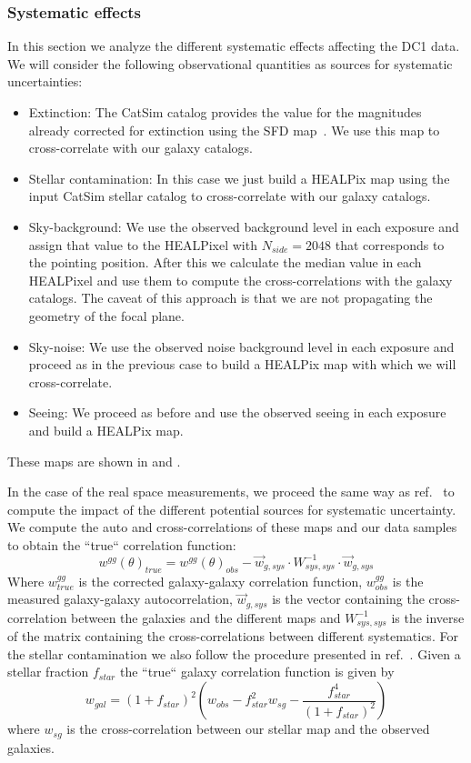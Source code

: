 \documentclass[\docopts]{\docclass}
\begin{document}
\subsubsection{Systematic effects}
\label{ssec:systematics}
In this section we analyze the different systematic effects affecting the DC1 data. We will consider the following observational quantities as sources for systematic uncertainties:
\begin{itemize}
\item Extinction: The CatSim catalog provides the value for the magnitudes already corrected for extinction using the SFD map~\citep{1998ApJ...500..525S}. We use this map to cross-correlate with our galaxy catalogs.
\item Stellar contamination: In this case we just build a HEALPix map using the input CatSim stellar catalog to cross-correlate with our galaxy catalogs.
\item Sky-background: We use the observed background level in each exposure and assign that value to the HEALPixel with $N_{side}=2048$ that corresponds to the pointing position. After this we calculate the median value in each HEALPixel and use them to compute the cross-correlations with the galaxy catalogs. The caveat of this approach is that we are not propagating the geometry of the focal plane.
\item Sky-noise: We use the observed noise background level in each exposure and proceed as in the previous case to build a HEALPix map with which we will cross-correlate.
\item Seeing: We proceed as before and use the observed seeing in each exposure and build a HEALPix map.
\end{itemize}
These maps are shown in  and . 

In the case of the real space measurements, we proceed the same way as ref.~\citep{2016MNRAS.455.4301C} to compute the impact of the different potential sources for systematic uncertainty. We compute the auto and cross-correlations of these maps and our data samples to obtain the ``true`` correlation function:
\begin{equation}
w^{gg}(\theta)_{true} =w^{gg}(\theta)_{obs} -  \vec{w}_{g,sys} \cdot W_{sys,sys}^{-1} \cdot \vec{w}_{g,sys}
\end{equation}
Where $w^{gg}_{true}$ is the corrected galaxy-galaxy correlation function, $w^{gg}_{obs}$ is the measured galaxy-galaxy autocorrelation, $\vec{w}_{g,sys}$ is the vector containing the cross-correlation between the galaxies and the different maps and $W_{sys,sys}^{-1}$ is the inverse of the matrix containing the cross-correlations between different systematics. For the stellar contamination we also follow the procedure presented in ref.~\citep{2016MNRAS.455.4301C}. Given a stellar fraction $f_{star}$ the ``true`` galaxy correlation function is given by
\begin{equation}
w_{gal} = \left(1+f_{star}\right)^{2}\left(w_{obs} - f_{star}^{2}w_{sg} - \frac{f_{star}^{4}}{\left(1+f_{star}\right)^{2}}\right)
\end{equation}
where $w_{sg}$ is the cross-correlation between our stellar map and the observed galaxies.
\end{document}
